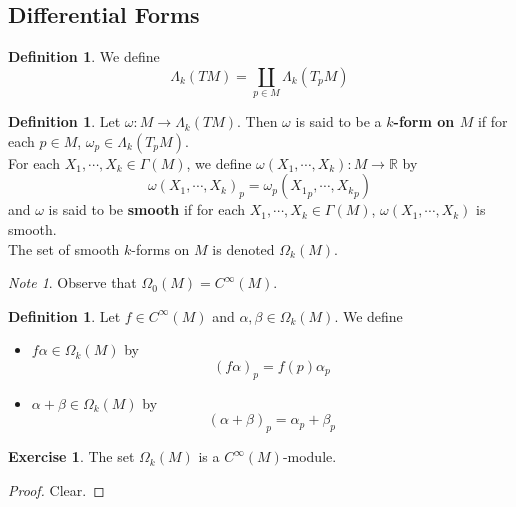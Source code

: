 \documentclass[12pt]{amsart}
\theoremstyle{definition}
\newtheorem{defn}[definition]{Definition}
\theoremstyle{remark}
\newtheorem{note}[remark]{Note}
\theoremstyle{definition}
\newtheorem{ex}[definition]{Exercise}
\newcommand{\al}{\alpha}
\newcommand{\Gam}{\Gamma}
\newcommand{\bet}{\beta}
\newcommand{\Lam}{\Lambda}
\newcommand{\om}{\omega}
\newcommand{\Om}{\Omega}
\newcommand{\R}{\mathbb{R}}
\begin{document}
	
	
	
	
	
	
	
	
	
	
	
	
	
	
	

	
	\newpage	
	\subsection{Differential Forms}
	
	\begin{defn}
		We define $$\Lam_k (TM) = \coprod_{p \in M} \Lam_k(T_p M)$$
	\end{defn}
	
	\begin{defn}
		Let $\om: M \rightarrow \Lam_k (TM)$. Then $\om$ is said to be a \textbf{$k$-form on $M$} if for each $p \in M$, $\om_p \in \Lam_k(T_pM)$.\\
		For each $X_1, \cdots, X_k \in \Gam(M)$, we define $\om(X_1, \cdots, X_k) : M \rightarrow \R$ by $$\om(X_1, \cdots, X_k)_p = \om_p({X_1}_p, \cdots, {X_k}_p)$$
		and $\om$ is said to be \textbf{smooth} if for each $X_1, \cdots, X_k \in \Gam(M)$, $\om(X_1, \cdots, X_k)$ is smooth.\\
		The set of smooth $k$-forms on $M$ is denoted $\Om_k(M)$.\\
	\end{defn} 

	\begin{note}
		Observe that $\Om_0(M) = C^{\infty}(M)$.
	\end{note}
	
	\begin{defn}
	Let $f \in C^{\infty}(M)$ and $\al, \bet \in \Om_k(M)$. We define 
	\begin{itemize}
	\item $f \al \in \Om_k(M)$ by $$(f\al)_p = f(p)\al_p$$
	\item $\al+\bet \in \Om_k(M)$ by $$(\al+\bet)_p = \al_p+\bet_p$$
	\end{itemize}
	\end{defn}	
	
	\begin{ex}
	The set $\Om_k(M)$ is a $C^{\infty}(M)$-module.
	\end{ex}
	
	\begin{proof}
	Clear.
	\end{proof}
\end{document}
